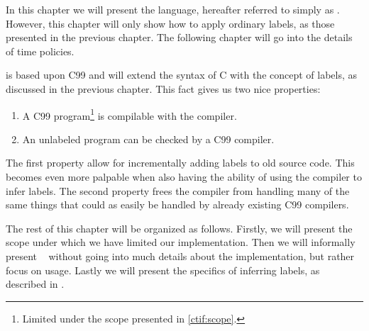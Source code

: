 
In this chapter we will present the \thelanglong{} language, hereafter referred to simply as \thelang.
However, this chapter will only show how to apply ordinary labels, as those presented in the previous chapter.
The following chapter will go into the details of time policies.

\thelang{} is based upon C99 and will extend the syntax of C with the concept of labels, as discussed in the previous chapter.
This fact gives us two nice properties:
\begin{enumerate}
  \item A C99 program\footnote{Limited under the scope presented in \cref{ctif:scope}.} is compilable with the \thelang{} compiler.
  \item An unlabeled \thelang{} program can be checked by a C99 compiler.
\end{enumerate}
The first property allow for incrementally adding labels to old source code.
This becomes even more palpable when also having the ability of using the \thelang{} compiler to infer labels.
The second property frees the \thelang{} compiler from handling many of the same things that could as easily be handled by already existing C99 compilers.

The rest of this chapter will be organized as follows.
Firstly, we will present the scope under which we have limited our implementation.
Then we will informally present \thelang~ without going into much details about the implementation, but rather focus on usage.
Lastly we will present the specifics of inferring labels, as described in .
